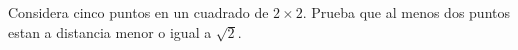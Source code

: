 \begin{problem}
    [\cite{112CP}]
    Considera cinco puntos en un cuadrado de $2\times2$. Prueba que 
    al menos dos puntos estan a distancia menor o igual a $\sqrt{2}$.
    \label{112CP152}
\end{problem}